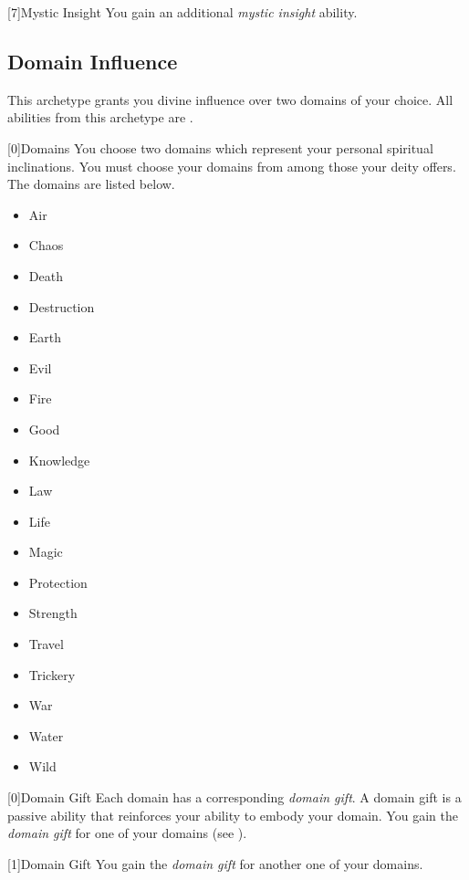         [7]{Mystic Insight}
        You gain an additional \textit{mystic insight} ability.

    \newpage
    \subsection{Domain Influence}
        This archetype grants you divine influence over two domains of your choice.
        All abilities from this archetype are .

        [0]{Domains}
        You choose two domains which represent your personal spiritual inclinations.
        You must choose your domains from among those your deity offers.
        The domains are listed below.

        \begin{itemize}
            \item{Air}
            \item{Chaos}
            \item{Death}
            \item{Destruction}
            \item{Earth}
            \item{Evil}
            \item{Fire}
            \item{Good}
            \item{Knowledge}
            \item{Law}
            \item{Life}
            \item{Magic}
            \item{Protection}
            \item{Strength}
            \item{Travel}
            \item{Trickery}
            \item{War}
            \item{Water}
            \item{Wild}
        \end{itemize}

        [0]{Domain Gift}
        Each domain has a corresponding \textit{domain gift}.
        A domain gift is a passive ability that reinforces your ability to embody your domain.
        You gain the \textit{domain gift} for one of your domains (see ).

        [1]{Domain Gift}
        You gain the \textit{domain gift} for another one of your domains.

